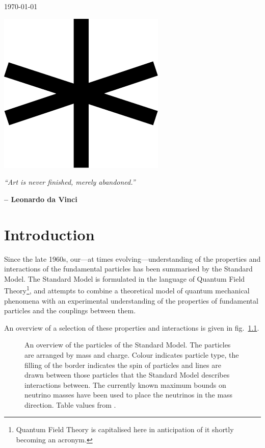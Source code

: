 \begin{titlingpage}
{{\begin{hangparas}{0em}{0}
\today
\end{hangparas}
}
\clearpage}
\thispagestyle{empty}
  \phantom{p}
\vspace{1.16\textwidth}

\begin{center}
\includegraphics[width=.1\textwidth]{star1}

\vspace{2em}
\begin{minipage}{.6\textwidth}
\emph{``Art is never finished, merely abandoned.''}

\raggedleft\small\sffamily\bfseries\vspace{1em} -- Leonardo da Vinci
\end{minipage}
\end{center}
\clearpage
\end{titlingpage}
\frontmatter

\tableofcontents
\mainmatter

\chapter{Introduction}

Since the late 1960s, our---at times evolving---understanding of the properties and interactions of the fundamental particles has been summarised by the Standard Model. The Standard Model is formulated in the language of Quantum Field Theory\footnote{Quantum Field Theory is capitalised here in anticipation of it shortly becoming an acronym.}, and attempts to combine a theoretical model of quantum mechanical phenomena with an experimental understanding of the properties of fundamental particles and the couplings between them.

An overview of a selection of these properties and interactions is given in fig.~\ref{SMsum}.

\begin{figure}[htp]
\begin{minipage}[b]{.745\textwidth}

\end{minipage}
\hfill\begin{minipage}[b]{.25\textwidth}
\caption{An overview of the particles of the Standard Model. The particles are arranged by mass and charge. Colour indicates particle type, the filling of the border indicates the spin of particles and lines are drawn between those particles that the Standard Model describes interactions between. The currently known maximum bounds on neutrino masses have been used to place the neutrinos in the mass direction. Table values from \cite{wikism}.\label{SMsum}}
\end{minipage}
\end{figure}

